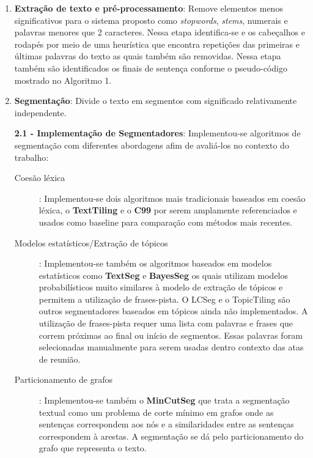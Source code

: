 \begin{enumerate}
	\item \textbf{Extração de texto e pré-processamento}: Remove elementos menos significativos para o sistema proposto como \textit{stopwords}, \textit{stems}, numerais e palavras menores que 2 caracteres. Nessa etapa identifica-se e os cabeçalhos e rodapés por meio de uma heurística que encontra repetições das primeiras e últimas palavras do texto as quais também são removidas. Nessa etapa também são identificados os finais de sentença conforme o pseudo-código mostrado no Algoritmo 1.

	\item \textbf{Segmentação}: Divide o texto em segmentos com significado relativamente independente.

	\textbf{2.1 - Implementação de Segmentadores}: 
	Implementou-se algoritmos de segmentação com diferentes abordagens afim de avaliá-los no contexto do trabalho:
	
	\begin{description}
		\item[Coesão léxica]: Implementou-se dois algoritmos mais tradicionais baseados em coesão léxica, o \textbf{TextTiling} e o \textbf{C99} por serem amplamente referenciados e usados como baseline para comparação com métodos mais recentes.
		\item[Modelos estatísticos/Extração de tópicos]: Implementou-se também os algoritmos baseados em modelos estatísticos como \textbf{TextSeg} e \textbf{BayesSeg} os quais utilizam modelos probabilísticos muito similares à modelo de extração de tópicos e permitem a utilização de frases-pista. 
		O LCSeg e o TopicTiling são outros segmentadores baseados em tópicos ainda não implementados.
			A utilização de frases-pista requer uma lista com palavras e frases que correm próximas ao final ou início de segmentos. Essas palavras foram selecionadas manualmente para serem usadas dentro contexto das atas de reunião. %
	

		\item[Particionamento de grafos]: Implementou-se também o \textbf{MinCutSeg} que trata a segmentação textual como um problema de corte mínimo em grafos onde as sentenças correspondem aos nós e a similaridades entre as sentenças correspondem à arestas. A segmentação se dá pelo particionamento do grafo que representa o texto.	


\end{description}
\end{enumerate}
